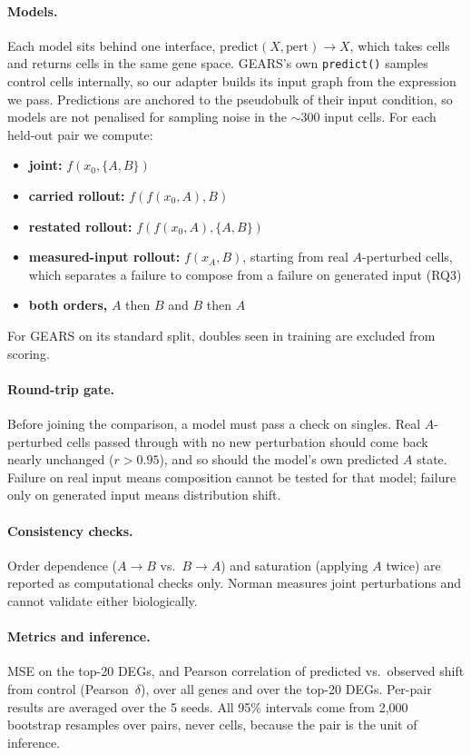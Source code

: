 \documentclass[11pt]{article}
\newcommand{\pd}{Pearson~$\delta$}
\begin{document}
\paragraph{Models.} Each model sits behind one interface, $\mathrm{predict}(X,
\mathrm{pert}) \to X$, which takes cells and returns cells in the same gene space. GEARS's
own \texttt{predict()} samples control cells internally, so our adapter builds its input
graph from the expression we pass. Predictions are anchored to the pseudobulk of their
input condition, so models are not penalised for sampling noise in the $\sim$300 input
cells. For each held-out pair we compute:
\begin{itemize}
  \item \textbf{joint:} $f(x_0, \{A, B\})$
  \item \textbf{carried rollout:} $f(f(x_0, A), B)$
  \item \textbf{restated rollout:} $f(f(x_0, A), \{A, B\})$
  \item \textbf{measured-input rollout:} $f(x_A, B)$, starting from real $A$-perturbed
  cells, which separates a failure to compose from a failure on generated input (RQ3)
  \item \textbf{both orders,} $A$ then $B$ and $B$ then $A$
\end{itemize}
For GEARS on its standard split, doubles seen in training are excluded from scoring.

\paragraph{Round-trip gate.} Before joining the comparison, a model must pass a check on
singles. Real $A$-perturbed cells passed through with no new perturbation should come back
nearly unchanged ($r > 0.95$), and so should the model's own predicted $A$ state. Failure on
real input means composition cannot be tested for that model; failure only on generated
input means distribution shift.

\paragraph{Consistency checks.} Order dependence ($A\to B$ vs.\ $B\to A$) and saturation
(applying $A$ twice) are reported as computational checks only. Norman measures joint
perturbations and cannot validate either biologically.

\paragraph{Metrics and inference.} MSE on the top-20 DEGs, and Pearson correlation of
predicted vs.\ observed shift from control (\pd), over all genes and over the top-20 DEGs.
Per-pair results are averaged over the 5 seeds. All 95\% intervals come from 2,000
bootstrap resamples over pairs, never cells, because the pair is the unit of inference.
\end{document}
